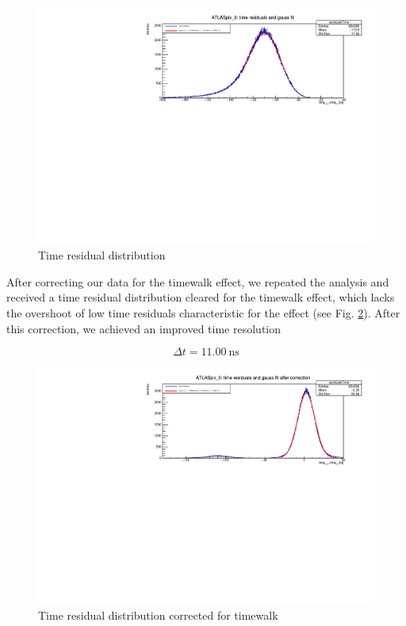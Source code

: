 \documentclass[twocolumn,DIV=14,a4paper,biblatex, 10pt]{scrartcl}
\begin{document}
\begin{figure}
  \centering
  \includegraphics[width=\linewidth]{10_residuals_time.pdf}
  \caption{Time residual distribution}
  \label{fig:time_residuals}
\end{figure}

After correcting our data for the timewalk effect, we repeated the analysis and received a time residual distribution cleared for the timewalk effect, which lacks the overshoot of low time residuals characteristic for the effect (see Fig. \ref{fig:time_residuals_corr}). After this correction, we achieved an improved time resolution

\begin{equation}
  \Delta t = \SI{11.00}{\nano\second}
\end{equation}

\begin{figure}
  \centering
  \includegraphics[width=\linewidth]{11_residuals_time_time_correction.pdf}
  \caption{Time residual distribution corrected for timewalk}
  \label{fig:time_residuals_corr}
\end{figure}
\end{document}
